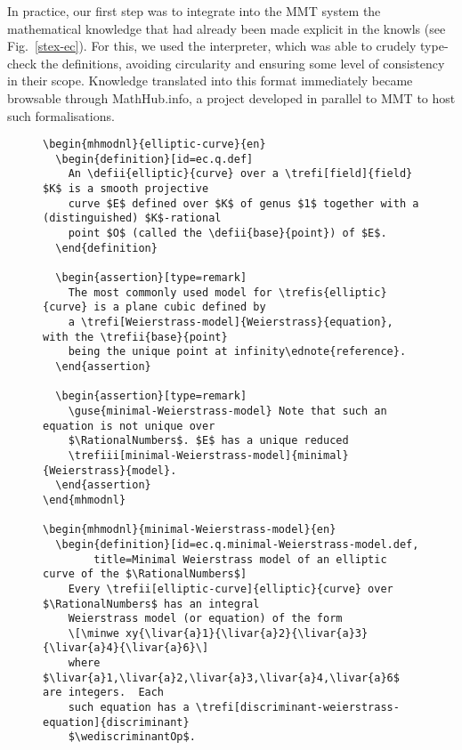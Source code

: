 In practice, our first step was to integrate into the MMT system the mathematical knowledge that had already been made explicit in the knowls (see Fig.~\ref{stex-ec}). For this, we used the \stex interpreter, which was able to crudely type-check the definitions, avoiding circularity and ensuring some level of consistency in their scope. Knowledge translated into this format immediately became browsable through \textsf{MathHub.info}, a project developed in parallel to MMT to host such formalisations. 

\begin{figure}
\begin{verbatim}
\begin{mhmodnl}{elliptic-curve}{en}
  \begin{definition}[id=ec.q.def]
    An \defii{elliptic}{curve} over a \trefi[field]{field} $K$ is a smooth projective
    curve $E$ defined over $K$ of genus $1$ together with a (distinguished) $K$-rational 
    point $O$ (called the \defii{base}{point}) of $E$.
  \end{definition}
  
  \begin{assertion}[type=remark]
    The most commonly used model for \trefis{elliptic}{curve} is a plane cubic defined by
    a \trefi[Weierstrass-model]{Weierstrass}{equation}, with the \trefii{base}{point}
    being the unique point at infinity\ednote{reference}.
  \end{assertion}
  
  \begin{assertion}[type=remark]
    \guse{minimal-Weierstrass-model} Note that such an equation is not unique over
    $\RationalNumbers$. $E$ has a unique reduced
    \trefiii[minimal-Weierstrass-model]{minimal}{Weierstrass}{model}.
  \end{assertion}
\end{mhmodnl}

\begin{mhmodnl}{minimal-Weierstrass-model}{en}
  \begin{definition}[id=ec.q.minimal-Weierstrass-model.def, 
  		title=Minimal Weierstrass model of an elliptic curve of the $\RationalNumbers$]
    Every \trefii[elliptic-curve]{elliptic}{curve} over $\RationalNumbers$ has an integral
    Weierstrass model (or equation) of the form
    \[\minwe xy{\livar{a}1}{\livar{a}2}{\livar{a}3}{\livar{a}4}{\livar{a}6}\]
    where $\livar{a}1,\livar{a}2,\livar{a}3,\livar{a}4,\livar{a}6$ are integers.  Each
    such equation has a \trefi[discriminant-weierstrass-equation]{discriminant}
    $\wediscriminantOp$.


\end{verbatim}
\end{figure}
